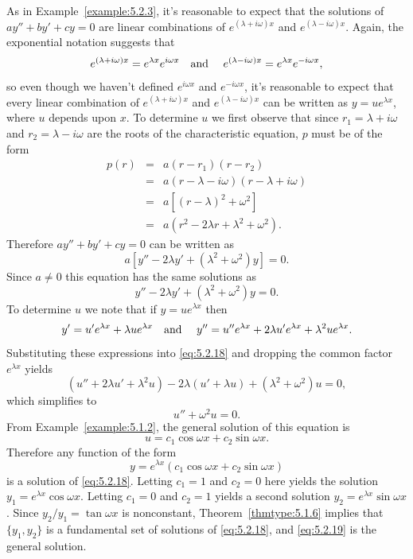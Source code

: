 As in Example~\ref{example:5.2.3}, it's reasonable to expect that the solutions of $ay''+by'+cy=0$
are linear combinations of $e^{(\lambda+i\omega)x}$ and $e^{(\lambda-i\omega)x}$. Again, the
exponential notation suggests that
\[
  e^{(\lambda+i\omega)x}=e^{\lambda x}e^{i\omega x}\mbox{\quad and \quad}e^{(\lambda-i\omega)x}=e^{\lambda x}e^{-i\omega x},
\]
so even though we haven't defined $e^{i\omega x}$ and $e^{-i\omega x}$, it's reasonable to expect
that every linear combination of $e^{(\lambda+i\omega)x}$ and $e^{(\lambda-i\omega)x}$ can be
written as $y=ue^{\lambda x}$, where $u$ depends upon $x$. To determine $u$ we first observe that
since $r_{1}=\lambda+i\omega$ and $r_{2}=\lambda-i\omega$ are the roots of the characteristic
equation, $p$ must be of the form
\[
  \begin{array}{ccl}
    p(r) & = & a(r-r_{1})(r-r_{2})                         \\
         & = & a(r-\lambda-i\omega)(r-\lambda+i\omega)     \\
         & = & a\left[(r-\lambda)^{2}+\omega^{2}\right]    \\
         & = & a(r^{2}-2\lambda r+\lambda^{2}+\omega^{2}).
  \end{array}
\]
Therefore $ay''+by'+cy=0$ can be written as
\[
  a\left[y''-2\lambda y'+(\lambda^{2}+\omega^{2})y\right]=0.
\]
Since $a\ne0$ this equation has the same solutions as
\begin{equation}
  \label{eq:5.2.18}y''-2\lambda y'+(\lambda^{2}+\omega^{2})y=0.
\end{equation}
To determine $u$ we note that if $y=ue^{\lambda x}$ then
\[
  y'=u'e^{\lambda x}+\lambda ue^{\lambda x}\mbox{\quad and \quad}y''=u''e^{\lambda x}+2\lambda u'e^{\lambda x}+\lambda^{2}ue^{\lambda x}.
\]
Substituting these expressions into \eqref{eq:5.2.18} and dropping the common factor $e^{\lambda x}$
yields
\[
  (u''+2\lambda u'+\lambda^{2}u)-2\lambda(u'+\lambda u) +(\lambda^{2}+\omega^{2})u=0,
\]
which simplifies to
\[
  u''+\omega^{2}u=0.
\]
From Example~\ref{example:5.1.2}, the general solution of this equation is
\[
  u=c_{1}\cos\omega x+c_{2}\sin\omega x.
\]
Therefore any function of the form
\begin{equation}
  \label{eq:5.2.19}y=e^{\lambda x}(c_{1}\cos\omega x+c_{2}\sin\omega x)
\end{equation}
is a solution of \eqref{eq:5.2.18}. Letting $c_{1}=1$ and $c_{2}=0$ here yields the solution
$y_{1}=e^{\lambda x}\cos\omega x$. Letting $c_{1}=0$ and $c_{2}=1$ yields a second solution
$y_{2}=e^{\lambda x}\sin\omega x$. Since $y_{2}/y_{1}=\tan\omega x$ is nonconstant, Theorem~\ref{thmtype:5.1.6} implies that $\{y_{1},y_{2}\}$ is a fundamental set of solutions of
\eqref{eq:5.2.18}, and \eqref{eq:5.2.19} is the general solution.

